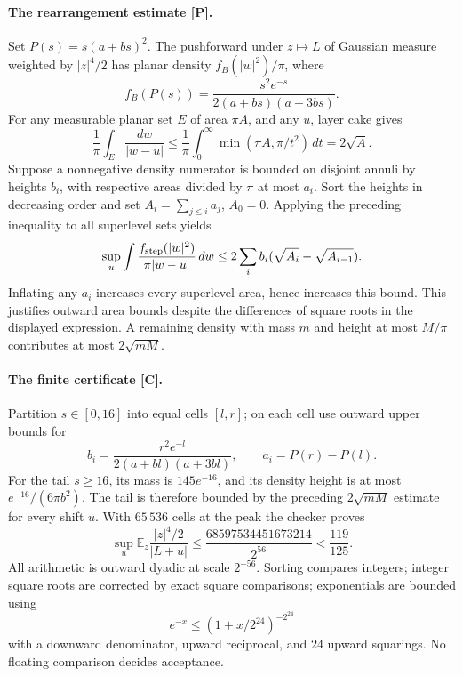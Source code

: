 \paragraph{The rearrangement estimate [P].}
Set \(P(s)=s(a+bs)^2\).  The pushforward under \(z\mapsto L\) of Gaussian
measure weighted by \(|z|^4/2\) has planar density \(f_B(|w|^2)/\pi\), where
\begin{equation}
 f_B(P(s))=\frac{s^2e^{-s}}{2(a+bs)(a+3bs)}.
 \label{eq:b-rearrange-density}
\end{equation}
For any measurable planar set \(E\) of area \(\pi A\), and any \(u\),
layer cake gives
\[
 \frac1\pi\int_E\frac{dw}{|w-u|}
 \leq\frac1\pi\int_0^\infty\min(\pi A,\pi/t^2)\,dt=2\sqrt A.
\]
Suppose a nonnegative density numerator is bounded on disjoint annuli
by heights \(b_i\), with respective areas divided by \(\pi\) at most
\(a_i\).  Sort the heights in decreasing order and set
\(A_i=\sum_{j\leq i}a_j\), \(A_0=0\).  Applying the preceding inequality
to all superlevel sets yields
\begin{equation}
 \sup_u\int\frac{f_{\rm step}(|w|^2)}{\pi|w-u|}\,dw
 \leq 2\sum_i b_i(\sqrt{A_i}-\sqrt{A_{i-1}}).
 \label{eq:b-rearrange-step}
\end{equation}
Inflating any \(a_i\) increases every superlevel area, hence increases
this bound.  This justifies outward area bounds despite the differences
of square roots in the displayed expression.  A remaining density with
mass \(m\) and height at most \(M/\pi\) contributes at most \(2\sqrt{mM}\).

\paragraph{The finite certificate [C].}
Partition \(s\in[0,16]\) into equal cells \([l,r]\); on each cell use
outward upper bounds for
\[
 b_i=\frac{r^2e^{-l}}{2(a+bl)(a+3bl)},\qquad a_i=P(r)-P(l).
\]
For the tail \(s\geq16\), its mass is \(145e^{-16}\), and its density
height is at most \(e^{-16}/(6\pi b^2)\).  The tail is therefore bounded
by the preceding \(2\sqrt{mM}\) estimate for every shift \(u\).
With \(65\,536\) cells at the peak the checker proves
\begin{equation}
 \sup_u\mathbb E_z\frac{|z|^4/2}{|L+u|}
 \leq\frac{68597534451673214}{2^{56}}<\frac{119}{125}.
 \label{eq:b-rearrange-cap}
\end{equation}
All arithmetic is outward dyadic at scale \(2^{-56}\).  Sorting compares
integers; integer square roots are corrected by exact square comparisons;
exponentials are bounded using
\[
 e^{-x}\leq(1+x/2^{24})^{-2^{24}}
\]
with a downward denominator, upward reciprocal, and \(24\) upward
squarings.  No floating comparison decides acceptance.

